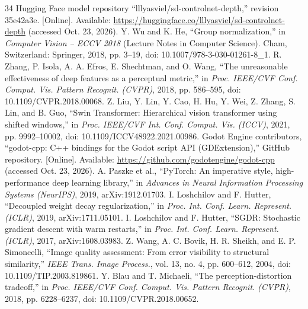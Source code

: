 \documentclass[conference]{IEEEtran}
\begin{document}
\begin{thebibliography}{34}
 Hugging Face model repository ``lllyasviel/sd-controlnet-depth,'' revision 35e42a3e. [Online]. Available: \url{https://huggingface.co/lllyasviel/sd-controlnet-depth} (accessed Oct. 23, 2026).
 Y. Wu and K. He, ``Group normalization,'' in \textit{Computer Vision – ECCV 2018} (Lecture Notes in Computer Science). Cham, Switzerland: Springer, 2018, pp. 3–19, doi: 10.1007/978-3-030-01261-8\_1.
 R. Zhang, P. Isola, A. A. Efros, E. Shechtman, and O. Wang, ``The unreasonable effectiveness of deep features as a perceptual metric,'' in \textit{Proc. IEEE/CVF Conf. Comput. Vis. Pattern Recognit. (CVPR)}, 2018, pp. 586–595, doi: 10.1109/CVPR.2018.00068.
 Z. Liu, Y. Lin, Y. Cao, H. Hu, Y. Wei, Z. Zhang, S. Lin, and B. Guo, ``Swin Transformer: Hierarchical vision transformer using shifted windows,'' in \textit{Proc. IEEE/CVF Int. Conf. Comput. Vis. (ICCV)}, 2021, pp. 9992–10002, doi: 10.1109/ICCV48922.2021.00986.
 Godot Engine contributors, ``godot-cpp: C++ bindings for the Godot script API (GDExtension),'' GitHub repository. [Online]. Available: \url{https://github.com/godotengine/godot-cpp} (accessed Oct. 23, 2026).
 A. Paszke et al., ``PyTorch: An imperative style, high-performance deep learning library,'' in \textit{Advances in Neural Information Processing Systems (NeurIPS)}, 2019, arXiv:1912.01703.
 I. Loshchilov and F. Hutter, ``Decoupled weight decay regularization,'' in \textit{Proc. Int. Conf. Learn. Represent. (ICLR)}, 2019, arXiv:1711.05101.
 I. Loshchilov and F. Hutter, ``SGDR: Stochastic gradient descent with warm restarts,'' in \textit{Proc. Int. Conf. Learn. Represent. (ICLR)}, 2017, arXiv:1608.03983.
 Z. Wang, A. C. Bovik, H. R. Sheikh, and E. P. Simoncelli, ``Image quality assessment: From error visibility to structural similarity,'' \textit{IEEE Trans. Image Process.}, vol. 13, no. 4, pp. 600–612, 2004, doi: 10.1109/TIP.2003.819861.
 Y. Blau and T. Michaeli, ``The perception-distortion tradeoff,'' in \textit{Proc. IEEE/CVF Conf. Comput. Vis. Pattern Recognit. (CVPR)}, 2018, pp. 6228–6237, doi: 10.1109/CVPR.2018.00652.
\end{thebibliography}
\end{document}
